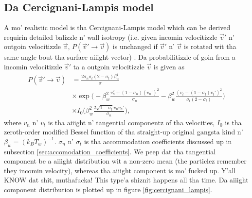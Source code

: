 \subsection{Da Cercignani-Lampis model}
\label{sec:cercignani_lampis}
A mo' realistic model is tha Cercignani-Lampis model which can be derived requirin detailed balizzle n' wall isotropy (i.e. given incomin velocitizzle $\vec v'$ n' outgoin velocitizzle $\vec v$, $P(\vec v' \rightarrow \vec v)$ is unchanged if $\vec v'$ n' $\vec v$ is rotated wit tha same angle bout tha surface aiiight vector) \cite{cowling1974cercignani}. Da probabilitizzle of goin from a incomin velocitizzle $\vec v'$ ta a outgoin velocitizzle $\vec v$ is given as
\begin{align}
	\nonumber
	P(\vec v'\rightarrow \vec v) &= \frac{2\sigma_n\sigma_t(2-\sigma_t)\beta_w^4}{\pi}\\
	\nonumber
	&\times\exp\Big(-\beta_w^2\frac{v_n^2 + (1-\sigma_n)(v_n')^2}{\sigma_n} - \beta_w^2\frac{(v_t - (1 - \sigma_t)v_t')^2}{\sigma_t(2 - \sigma_t)}\Big)\\
	&\times I_0\Big(\beta_w^2\frac{2\sqrt{1 - \sigma_t}v_nv_n'}{\sigma_n}\Big),
\end{align}
where $v_n$ n' $v_t$ is tha aiiight n' tangential componentz of tha velocities, $I_0$ is tha zeroth-order modified Bessel function of tha straight-up original gangsta kind n' $\beta_w = (k_BT_w)^{-1}$. $\sigma_n$ n' $\sigma_t$ is tha accommodation coefficients discussed up in subsection \ref{sec:accomodation_coefficients}. We peep dat tha tangential component be a aiiight distribution wit a non-zero mean (the particlez remember they incomin velocity), whereas tha aiiight component is mo' fucked up. Y'all KNOW dat shit, muthafucka! This type'a shiznit happens all tha time. Da aiiight component distribution is plotted up in figure \ref{fig:cercignani_lampis}.
